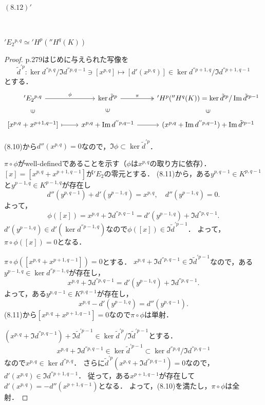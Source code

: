 \paragraph{\((8.12)'\)}~
\begin{screen}
  \('E_2{}^{p, q} \simeq{} 'H^p({}''H^q(K))\)
\end{screen}
\begin{proof}
  p.279はじめに与えられた写像を
  \[
  \tilde{d}^{\prime p} \colon \ker d^{''p,q} / \Im d^{''p, q-1} \ni [x^{p,q}]
  \mapsto [d'(x^{p,q})] \in \ker d^{''p+1, q} / \Im d^{''p+1, q-1}
  \]
  とする．
  \[
  \begin{tikzcd}
    'E_2{}^{p,q} \arrow[r, "\phi"]\arrow[d, phantom, sloped, "\ni"] & \ker\tilde{d}^{\prime p} \arrow[r, twoheadrightarrow, "\pi"]\arrow[d, phantom, sloped, "\ni"] & 'H^p({}''H^q(K)) = \ker\tilde{d}^{\prime p}/\Im\tilde{d}^{\prime p-1} \arrow[d, phantom, sloped, "\ni"] \\
    {[x^{p,q}+x^{p+1,q-1}]} \arrow[r, mapsto] & x^{p,q}+\Im d^{'' p, q-1} \arrow[r] & (x^{p,q}+\Im d^{'' p, q-1}) + \Im\tilde{d}^{\prime p-1}
  \end{tikzcd}
  \]

  (8.10)から\(d''(x^{p, q}) = 0\)なので，\(\Im\phi \subset \ker\tilde{d}^{\prime p}\)．

  \(\pi\circ\phi\)がwell-definedであることを示す（\(\phi\)は\(x^{p,q}\)の取り方に依存）．
  \([x]=[x^{p,q}+x^{p+1,q-1}]\)が\('E_2\)の零元とする．
  (8.11)から，ある\(y^{p, q-1} \in K^{p, q-1}\)と\(y^{p-1, q} \in K^{p-1, q}\)が存在し
  \[ d''(y^{p, q-1}) + d'(y^{p-1, q}) = x^{p, q} , \quad d''(y^{p-1, q}) = 0 . \]
  よって，
  \[ \phi([x]) = x^{p, q} + \Im d^{''p, q-1} = d'(y^{p-1, q}) + \Im d^{''p, q-1} . \]
  \(d'(y^{p-1, q}) \in d'(\ker d^{''p-1, q})\)なので\(\phi([x]) \in \Im\tilde{d}^{\prime p-1}\)．
  よって，\(\pi\circ\phi([x]) = 0\)となる．

  \(\pi\circ\phi([x^{p,q}+x^{p+1,q-1}])=0\)とする．
  \(x^{p,q} + \Im d^{''p, q-1} \in \Im\tilde{d}^{\prime p-1}\)なので，ある\(y^{p-1, q} \in \ker d^{''p-1, q}\)が存在し，
  \[ x^{p,q} + \Im d^{''p, q-1} = d'(y^{p-1, q}) + \Im d^{''p, q-1} . \]
  よって，ある\(y^{p, q-1} \in K^{p, q-1}\)が存在し，
  \[ x^{p, q} - d'(y^{p-1, q}) = d''(y^{p, q-1}) . \]
  (8.11)から\([x^{p,q}+x^{p+1,q-1}] = 0\)なので\(\pi\circ\phi\)は単射．

  \((x^{p,q}+\Im d^{'' p, q-1}) + \Im\tilde{d}^{\prime p-1} \in \ker\tilde{d}^{\prime p}/\Im\tilde{d}^{\prime p-1}\)とする．
  \[
  x^{p,q}+\Im d^{'' p, q-1} \in \ker\tilde{d}^{\prime p-1} \subset \ker d^{''p,q} / \Im d^{''p, q-1}
  \]
  なので\(x^{p,q} \in \ker d^{''p, q}\)．
  さらに\(\tilde{d}^{\prime p}(x^{p,q}+\Im d^{'' p, q-1}) = 0 \)なので，\(d'(x^{p,q}) \in \Im d^{''p+1, q-1}\)．
  従って，ある\(x^{p+1, q-1}\)が存在して\(d'(x^{p, q}) = - d''(x^{p+1, q-1})\)となる．
  よって，(8.10)を満たし，\(\pi\circ\phi\)は全射．
\end{proof}

